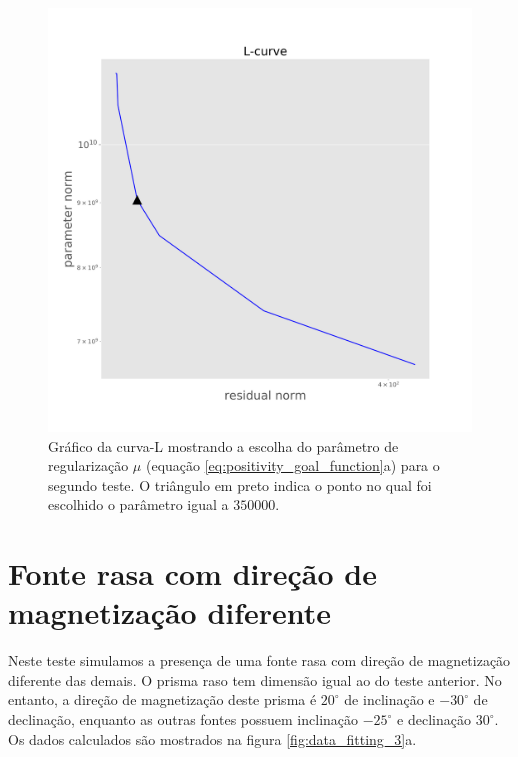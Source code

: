 \begin{figure}
	\centering
	\includegraphics[width=.9\textwidth]{Fig/eqlayer/unidir_shallow_test/Lcurve_RM.png}
	\caption{Gráfico da curva-L mostrando a escolha do parâmetro de regularização $\mu$ (equação \ref{eq:positivity_goal_function}a) para o segundo teste. O triângulo em preto indica o ponto no qual foi escolhido o parâmetro igual a $350000$.}
	\label{fig:lcurve_2}
\end{figure}


\section{Fonte rasa com direção de magnetização diferente}

Neste teste simulamos a presença de uma fonte rasa com direção de magnetização diferente das demais. O prisma raso tem dimensão igual ao do teste anterior. No entanto, a direção de magnetização deste prisma é $20^\circ$ de inclinação e $-30^\circ$ de declinação, enquanto as outras fontes possuem inclinação $-25^\circ$ e declinação $30^\circ$. Os dados calculados são mostrados na figura \ref{fig:data_fitting_3}a. 

